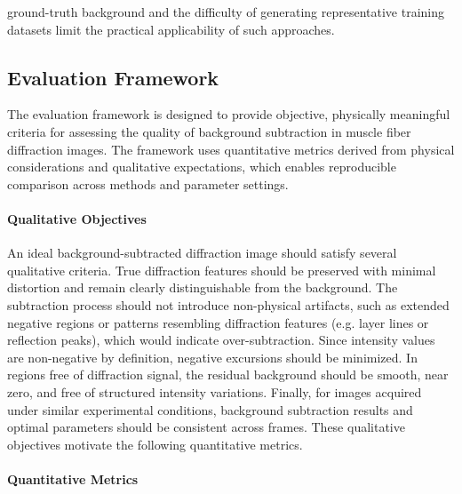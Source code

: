 \documentclass[iucr]{iucrjournals}
\begin{document}
ground-truth background and the difficulty of generating representative training datasets limit the practical applicability of such approaches.

\subsection{Evaluation Framework}

The evaluation framework is designed to provide objective, physically meaningful criteria for assessing the quality of background subtraction in muscle fiber diffraction images. The framework uses quantitative metrics derived from physical considerations and qualitative expectations, which enables reproducible comparison across methods and parameter settings.

\paragraph{Qualitative Objectives}

An ideal background-subtracted diffraction image should satisfy several qualitative criteria. True diffraction features should be preserved with minimal distortion and remain clearly distinguishable from the background. The subtraction process should not introduce non-physical artifacts, such as extended negative regions or patterns resembling diffraction features (e.g. layer lines or reflection peaks), which would indicate over-subtraction. Since intensity values are non-negative by definition, negative excursions should be minimized. In regions free of diffraction signal, the residual background should be smooth, near zero, and free of structured intensity variations. Finally, for images acquired under similar experimental conditions, background subtraction results and optimal parameters should be consistent across frames. These qualitative objectives motivate the following quantitative metrics.

\paragraph{Quantitative Metrics}
\end{document}
